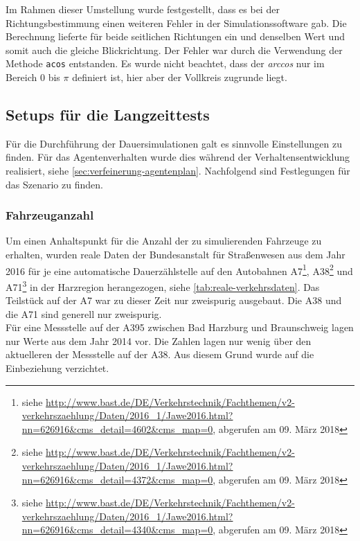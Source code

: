 Im Rahmen dieser Umstellung wurde festgestellt, dass es bei der Richtungsbestimmung einen weiteren Fehler in der Simulationssoftware gab.
Die Berechnung lieferte für beide seitlichen Richtungen ein und denselben Wert und somit auch die gleiche Blickrichtung.
Der Fehler war durch die Verwendung der Methode \texttt{acos} entstanden. Es wurde nicht beachtet, dass der \textit{arccos} nur im Bereich 0 bis $ \pi $ definiert ist, hier aber der Vollkreis zugrunde liegt.






\subsection{Setups für die Langzeittests}
\label{sec:setup-dauertests}

Für die Durchführung der Dauersimulationen galt es sinnvolle Einstellungen zu finden. 
Für das Agentenverhalten wurde dies während der Verhaltensentwicklung realisiert, siehe \cref{sec:verfeinerung-agentenplan}. 
Nachfolgend sind Festlegungen für das Szenario zu finden.



\subsubsection{Fahrzeuganzahl}
\label{sec:fahrzeuganzahl}

Um einen Anhaltspunkt für die Anzahl der zu simulierenden Fahrzeuge zu erhalten, wurden reale Daten der Bundesanstalt für Straßenwesen aus dem Jahr 2016 für je eine automatische Dauerzählstelle auf den Autobahnen A7\footnote{siehe \url{http://www.bast.de/DE/Verkehrstechnik/Fachthemen/v2-verkehrszaehlung/Daten/2016_1/Jawe2016.html?nn=626916&cms_detail=4602&cms_map=0}, abgerufen am 09. März 2018}, A38\footnote{siehe \url{http://www.bast.de/DE/Verkehrstechnik/Fachthemen/v2-verkehrszaehlung/Daten/2016_1/Jawe2016.html?nn=626916&cms_detail=4372&cms_map=0}, abgerufen am 09. März 2018} und A71\footnote{siehe \url{http://www.bast.de/DE/Verkehrstechnik/Fachthemen/v2-verkehrszaehlung/Daten/2016_1/Jawe2016.html?nn=626916&cms_detail=4340&cms_map=0}, abgerufen am 09. März 2018} in der Harzregion herangezogen, siehe \cref{tab:reale-verkehrsdaten}. 
Das Teilstück auf der A7 war zu dieser Zeit nur zweispurig ausgebaut. 
Die A38 und die A71 sind generell nur zweispurig.
\\
Für eine Messstelle auf der A395 zwischen Bad Harzburg und Braunschweig lagen nur Werte aus dem Jahr 2014 vor.
Die Zahlen lagen nur wenig über den aktuelleren der Messstelle auf der A38.
Aus diesem Grund wurde auf die Einbeziehung verzichtet.


